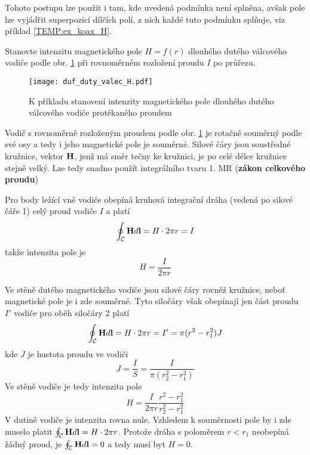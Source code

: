       Tohoto postupu lze použít i tam, kde uvedená podmínka není splněna, avšak pole lze vyjádřit
      superpozicí dílčích polí, z nich každé tuto podmínku splňuje, viz příklad \ref{TEMP:ex_koax_H}. 
      \begin{example}
       Stanovte intenzitu magnetického pole $H=f(r)$ dlouhého dutého válcového vodiče podle obr.
       \ref{TEMP:fig_pole_duty_valec} při rovnoměrném rozložení proudu $I$ po průřezu. 
             
      \begin{figure}[ht!]
        \centering
        \texttt{[image: duf\_duty\_valec\_H.pdf]}
        \caption[Pole dlouhého dutého válcového vodiče]{K příkladu stanovení intenzity magnetického
                 pole dlouhého dutého válcového vodiče protékaného proudem}
        \label{TEMP:fig_pole_duty_valec}
      \end{figure}

      Vodič s rovnoměrně rozloženým proudem podle obr. \ref{TEMP:fig_pole_duty_valec} je rotačně
      souměrný podle své osy a tedy i jeho magnetické pole je souměrné. Silové čáry jsou soustředné
      kružnice, vektor $\mathbf{H}$, jenž má směr tečny ke kružnici, je po celé délce kružnice stejně
      velký. Lze tedy snadno použít integrálního tvaru 1. MR (\textbf{zákon celkového proudu})

      Pro body ležící vně vodiče obepíná kruhová integrační dráha (vedená po silové čáře 1) celý
      proud vodiče $I$ a platí
      \begin{equation}\label{TEMP:eq_1MR_duty_valec}
        \oint_\mathcal{C}\mathbf{H}d\mathbf{l} = H\cdot 2\pi r = I
      \end{equation}
      takže intenzita pole je
      \begin{equation}\label{TEMP:eq_H_duty_valec}
        H = \frac{I}{2\pi r}
      \end{equation}

      Ve stěně dutého magnetického vodiče jsou silové čáry rovněž kružnice, neboť magnetické pole
      je i zde souměrné. Tyto siločáry však obepínají jen část proudu $I'$ vodiče pro oběh siločáry
      2 platí
      \begin{equation}\label{TEMP:eq_1MR_uvnitr_valce}
        \oint_\mathcal{C}\mathbf{H}d\mathbf{l} = H\cdot 2\pi r = I' = \pi(r^2-r_1^2)J
      \end{equation}
      kde $J$ je hustota proudu ve vodiči
      \begin{equation}\label{TEMP:eq_J_duty_valec}
        J = \frac{I}{S}= \frac{I}{\pi(r_2^2-r_1^2)}
      \end{equation}
      Ve stěně vodiče je tedy intenzita pole
      \begin{equation}\label{TEMP:eq_H_uvnitr_valce}
        H = \frac{I}{2\pi r}\frac{r^2-r_1^2}{r_2^2-r_1^2}
      \end{equation}
      V dutině vodiče je intenzita rovna nule. Vzhledem k souměrnosti pole by i zde muselo platit
      $\oint_\mathcal{C}\mathbf{H}d\mathbf{l} = H\cdot 2\pi r$. Protože dráha s poloměrem $r<r_1$ neobepíná
      žádný proud, je $\oint_\mathcal{C}\mathbf{H}d\mathbf{l} = 0$ a tedy musí byt $H = 0$.
      \end{example}    
      
